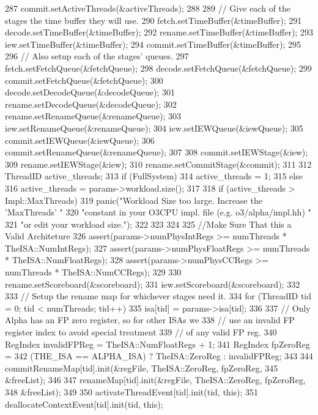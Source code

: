 \begin{DoxyCode}
{287     commit.setActiveThreads(&activeThreads);
288 
289     // Give each of the stages the time buffer they will use.
290     fetch.setTimeBuffer(&timeBuffer);
291     decode.setTimeBuffer(&timeBuffer);
292     rename.setTimeBuffer(&timeBuffer);
293     iew.setTimeBuffer(&timeBuffer);
294     commit.setTimeBuffer(&timeBuffer);
295 
296     // Also setup each of the stages' queues.
297     fetch.setFetchQueue(&fetchQueue);
298     decode.setFetchQueue(&fetchQueue);
299     commit.setFetchQueue(&fetchQueue);
300     decode.setDecodeQueue(&decodeQueue);
301     rename.setDecodeQueue(&decodeQueue);
302     rename.setRenameQueue(&renameQueue);
303     iew.setRenameQueue(&renameQueue);
304     iew.setIEWQueue(&iewQueue);
305     commit.setIEWQueue(&iewQueue);
306     commit.setRenameQueue(&renameQueue);
307 
308     commit.setIEWStage(&iew);
309     rename.setIEWStage(&iew);
310     rename.setCommitStage(&commit);
311 
312     ThreadID active_threads;
313     if (FullSystem) {
314         active_threads = 1;
315     } else {
316         active_threads = params->workload.size();
317 
318         if (active_threads > Impl::MaxThreads) {
319             panic("Workload Size too large. Increase the 'MaxThreads' "
320                   "constant in your O3CPU impl. file (e.g. o3/alpha/impl.hh) "
321                   "or edit your workload size.");
322         }
323     }
324 
325     //Make Sure That this a Valid Architeture
326     assert(params->numPhysIntRegs   >= numThreads * TheISA::NumIntRegs);
327     assert(params->numPhysFloatRegs >= numThreads * TheISA::NumFloatRegs);
328     assert(params->numPhysCCRegs >= numThreads * TheISA::NumCCRegs);
329 
330     rename.setScoreboard(&scoreboard);
331     iew.setScoreboard(&scoreboard);
332 
333     // Setup the rename map for whichever stages need it.
334     for (ThreadID tid = 0; tid < numThreads; tid++) {
335         isa[tid] = params->isa[tid];
336 
337         // Only Alpha has an FP zero register, so for other ISAs we
338         // use an invalid FP register index to avoid special treatment
339         // of any valid FP reg.
340         RegIndex invalidFPReg = TheISA::NumFloatRegs + 1;
341         RegIndex fpZeroReg =
342             (THE_ISA == ALPHA_ISA) ? TheISA::ZeroReg : invalidFPReg;
343 
344         commitRenameMap[tid].init(&regFile, TheISA::ZeroReg, fpZeroReg,
345                                   &freeList);
346 
347         renameMap[tid].init(&regFile, TheISA::ZeroReg, fpZeroReg,
348                             &freeList);
349 
350         activateThreadEvent[tid].init(tid, this);
351         deallocateContextEvent[tid].init(tid, this);
}}
\end{DoxyCode}
